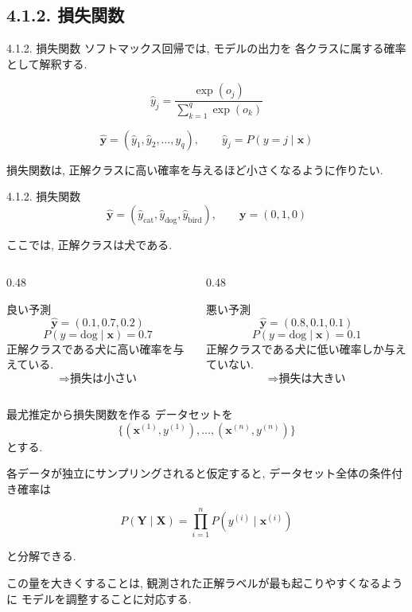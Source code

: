 \documentclass[dvipdfmx,uplatex,11pt]{beamer}
\begin{document}

\subsection{4.1.2. 損失関数}
\begin{frame}{4.1.2. 損失関数}
ソフトマックス回帰では, モデルの出力を
\alert{各クラスに属する確率}として解釈する.

\[
\hat{y}_j = \frac{\exp(o_j)}{\sum_{k=1}^{q} \exp(o_k)}
\]

\[
\hat{\bm y}
=
(\hat y_1,\hat y_2,\dots,\hat y_q),
\qquad
\hat y_j
=
P(y=j\mid \bm x)
\]

\begin{d2lplainbox}
損失関数は, \alert{正解クラスに高い確率を与えるほど小さくなる}ように作りたい.
\end{d2lplainbox}

\end{frame}


\begin{frame}{4.1.2. 損失関数}
\[
\hat{\bm y}=(\hat y_{\mathrm{cat}},\hat y_{\mathrm{dog}},\hat y_{\mathrm{bird}}),
\qquad
\bm y=(0,1,0)
\]

ここでは, 正解クラスは\alert{犬}である.

\begin{columns}[T]
\begin{column}{0.48\textwidth}
\begin{d2lbox}{良い予測}
\[
\hat{\bm y}=(0.1,0.7,0.2)
\]
\[
P(y=\mathrm{dog}\mid \bm x)=0.7
\]
正解クラスである犬に高い確率を与えている.
\[
\Rightarrow \text{損失は小さい}
\]
\end{d2lbox}
\end{column}

\begin{column}{0.48\textwidth}
\begin{d2lbox}{悪い予測}
\[
\hat{\bm y}=(0.8,0.1,0.1)
\]
\[
P(y=\mathrm{dog}\mid \bm x)=0.1
\]
正解クラスである犬に低い確率しか与えていない.
\[
\Rightarrow \text{損失は大きい}
\]
\end{d2lbox}
\end{column}
\end{columns}


\end{frame}


\begin{frame}{最尤推定から損失関数を作る}
データセットを
\[
\{(\bm x^{(1)},y^{(1)}),\dots,(\bm x^{(n)},y^{(n)})\}
\]
とする.

各データが独立にサンプリングされると仮定すると,
データセット全体の条件付き確率は

\[
P(\bm Y\mid \bm X)
=
\prod_{i=1}^{n}
P(y^{(i)}\mid \bm x^{(i)})
\]

と分解できる.

\begin{d2lplainbox}
この量を大きくすることは,
観測された正解ラベルが最も起こりやすくなるように
モデルを調整することに対応する.
\end{d2lplainbox}
\end{frame}
\end{document}
